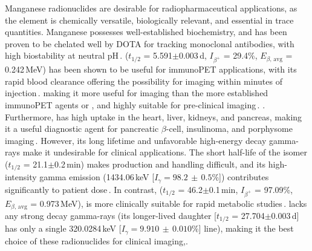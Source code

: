 Manganese radionuclides are desirable for radiopharmaceutical applications, as 
the element is chemically versatile,  biologically relevant, and essential in trace quantities. 
Manganese possesses well-established biochemistry, and has been proven to be chelated well by DOTA for tracking monoclonal antibodies, with high biostability at neutral pH\,\cite{Graves2015}.
 ($t_{1/2}$ = 5.591$\pm$0.003\,d, $I_{\beta^+}$ = 29.4\%, $E_{\beta\text{, avg}}$ = 0.242\,MeV) has been shown to be useful for immunoPET applications, with its rapid blood clearance offering the possibility for imaging within minutes of injection\,\cite{Dong2015}.
making it more useful for imaging  than the more established immunoPET agents  or   , and highly suitable for pre-clinical imaging\,\cite{Dong2015}.  . 
Furthermore,   has high uptake in the heart, liver, kidneys, and pancreas, making it a useful diagnostic agent for pancreatic $\beta$-cell, insulinoma, and porphysome imaging\,\cite{Graves2015}. 
However, its  long lifetime and unfavorable high-energy decay gamma-rays 
make it undesirable for clinical applications.
The short half-life of the   isomer ($t_{1/2}$ = 21.1$\pm$0.2\,min)
makes production and handling difficult, and its  high-intensity gamma emission (1434.06\,keV [$I_\gamma = 98.2\,\pm\,0.5\%$]) contributes significantly to patient dose\,\cite{Dong2015}.
In contrast,  ($t_{1/2}$ = 46.2$\pm$0.1\,min, $I_{\beta^+}$ = 97.09\%, $E_{\beta\text{, avg}}$ = 0.973\,MeV), 
is more clinically suitable for rapid metabolic studies\,\cite{Wang2017}.
 lacks any strong decay gamma-rays (its longer-lived daughter  [$t_{1/2}$ = 27.704$\pm$0.003\,d] has only a single  320.0284\,keV [$I_\gamma = 9.910\,\pm\,0.010\%$] line), making it the best choice of these radionuclides for clinical imaging,\cite{Wang2017}.








